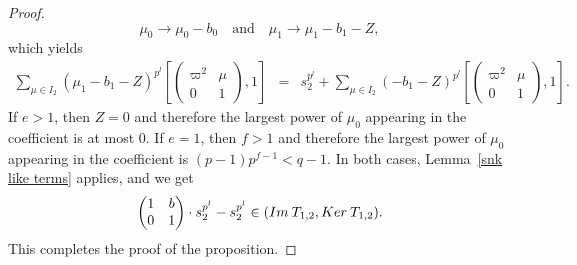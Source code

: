 \documentclass[10pt,a4paper]{amsart}
\newcommand{\Ker}{\rm{Ker}\>}
\newcommand{\im}{\rm{Im}\>}
\begin{document}
\begin{proof}
$$\mu_{0} \rightarrow \mu_{0}-b_0 \quad  \text{and} \quad \mu_{1} \rightarrow \mu_{1}-b_1-Z,$$
which yields
\begin{eqnarray*}
 \sum_{\mu \in I_2}(\mu_{1}-b_1-Z)^{p^l}\left[\begin{pmatrix} \varpi^2 & \mu  \\ 0 & 1\end{pmatrix}, 1\right]
 &= & s_{2}^{p^l}+\sum_{\mu \in I_2}(-b_1-Z)^{p^l}\left[\begin{pmatrix} \varpi^2 & \mu  \\ 0 & 1\end{pmatrix}, 1\right].
\end{eqnarray*}
If $e > 1$, then $Z = 0$ and therefore the largest power of $\mu_0$ appearing in the coefficient is at most $0$. If $e = 1$, then $f > 1$ and therefore the largest power of $\mu_0$ appearing in the coefficient is $(p - 1)p^{f - 1} < q - 1$. In both cases, Lemma~\ref{snk like terms} applies, and we get
\[
\begin{pmatrix}
      1 & b \\
      0 & 1
\end{pmatrix} \cdot s_{2}^{p^l}-s_2^{p^l} \in ({\im} T_{1,2}, {\Ker} T_{1,2}).
\]
This completes the proof of the proposition.
\end{proof}
\end{document}
